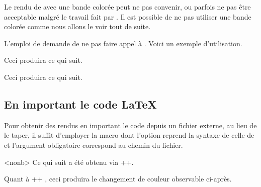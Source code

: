 Le rendu de  avec une bande colorée peut ne pas convenir, ou parfois ne pas être acceptable malgré le travail fait par .
Il est possible de ne pas utiliser une bande colorée comme nous allons le voir tout de suite.


\begin{tdocexa}
    L'emploi de  demande de ne pas faire appel à .
    Voici un exemple d'utilisation.


    Ceci produira ce qui suit.

    \medskip

    
\end{tdocexa}




\begin{tdocexa}
    \leavevmode


    Ceci produira ce qui suit.

    \medskip

    
\end{tdocexa}


\subsection{En important le code \LaTeX}

Pour obtenir des rendus en important le code depuis un fichier externe, au lieu de le taper, il suffit d'employer la macro  dont l'option reprend la syntaxe de celle de  et l'argument obligatoire correspond au chemin du fichier.


\begin{tdocexa}<nonb>
    Ce qui suit a été obtenu via \tdocinlatex++.

    \medskip


    \medskip

    Quant à \tdocinlatex++ , ceci produira le changement de couleur observable ci-après.

    \medskip

\end{tdocexa}


